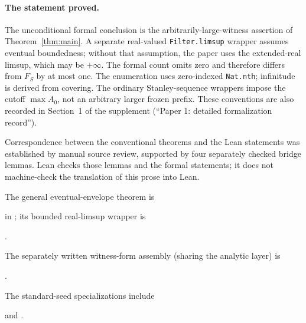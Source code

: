 \documentclass[11pt]{article}
\theoremstyle{definition}\newtheorem{definition}[theorem]{Definition}
\theoremstyle{remark}\newtheorem{remark}[theorem]{Remark}
\numberwithin{equation}{section}
\begin{document}
\paragraph{The statement proved.}
The unconditional formal conclusion is the arbitrarily-large-witness assertion
of Theorem~\ref{thm:main}. A separate real-valued \texttt{Filter.limsup} wrapper
assumes eventual boundedness; without that assumption, the paper uses the
extended-real limsup, which may be $+\infty$. The formal count omits zero and
therefore differs from $F_S$ by at most one. The enumeration uses
zero-indexed \texttt{Nat.nth}; infinitude is derived from covering.
The ordinary Stanley-sequence wrappers impose the cutoff $\max A_0$, not an
arbitrary larger frozen prefix. These conventions are also recorded in
Section~1 of the supplement (``Paper 1: detailed formalization record'').

Correspondence between the conventional theorems and the Lean statements was
established by manual source review, supported by four separately checked
bridge lemmas. Lean checks those lemmas and the formal statements; it does not
machine-check the translation of this prose into Lean.

The general eventual-envelope theorem is
\par\noindent{}\par
in ; its bounded real-limsup wrapper is
\par\noindent{}.\par
The separately written witness-form assembly (sharing the analytic layer) is
\par\noindent{}.\par
The standard-seed specializations include
\par\noindent{}\par
and .
\end{document}
